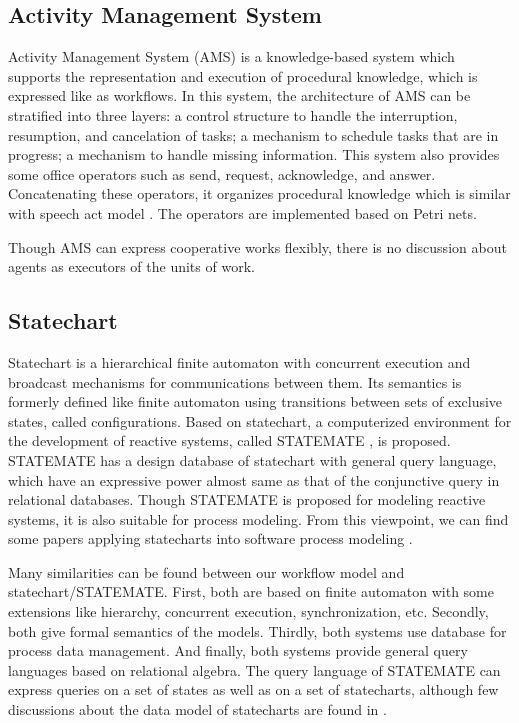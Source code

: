 \subsection{Activity Management System}

\begin{sloppypar}
 Activity Management System (AMS) \cite{tueni:studiescscw91} is a
 knowledge-based system which supports the representation and execution
 of procedural knowledge, which is expressed like as workflows.
 In this system, the architecture of AMS can be stratified into three
 layers: a control structure to handle the interruption, resumption, and
 cancelation of tasks; a mechanism to schedule tasks that are in
 progress; a mechanism to handle missing information.  This system also
 provides some office operators such as send, request, acknowledge, and
 answer.  Concatenating these operators, it organizes procedural
 knowledge which is similar with speech act model \cite{winograd:book86}.
 The operators are implemented based on Petri nets.
\end{sloppypar}

Though AMS can express cooperative works flexibly, there is no
discussion about agents as executors of the units of work.  

\subsection{Statechart}

Statechart \cite{harel:scp87} is a hierarchical finite automaton with
concurrent execution and broadcast mechanisms for communications between
them.  Its semantics is formerly defined like finite automaton using
transitions between sets of exclusive states, called configurations.
Based on statechart, a computerized environment for the development of
reactive systems, called STATEMATE \cite{harel:ieeese90}, is proposed.
STATEMATE has a design database of statechart with general query
language, which have an expressive power almost same as that of the
conjunctive query in relational databases.  Though STATEMATE is proposed 
for modeling reactive systems, it is also suitable for process
modeling.  From this viewpoint, we can find some papers applying
statecharts into software process modeling \cite{kellner:hawaiiconf89,
humphrey:icse89}.

Many similarities can be found between our workflow model and
statechart/STATEMATE\@.  First, both are based on finite automaton with
some extensions like hierarchy, concurrent execution, synchronization,
etc.  Secondly, both give formal semantics of the models.  Thirdly, both 
systems use database for process data management.  And finally, both
systems provide general query languages based on relational algebra.
The query language of STATEMATE can express queries on a set of states
as well as on a set of statecharts, although few discussions about the
data model of statecharts are found in \cite{harel:ieeese90}.

